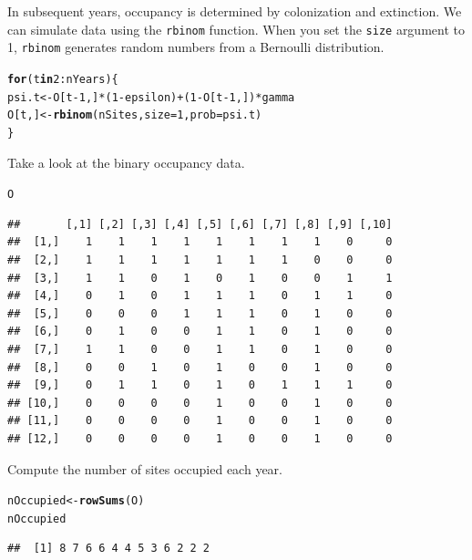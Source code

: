 \documentclass[12pt]{article}\usepackage[]{graphicx}\usepackage[]{color}
\makeatletter
\newcommand{\hlnum}[1]{\textcolor[rgb]{0.686,0.059,0.569}{#1}}%
\newcommand{\hlopt}[1]{\textcolor[rgb]{0,0,0}{#1}}%
\newcommand{\hlstd}[1]{\textcolor[rgb]{0.345,0.345,0.345}{#1}}%
\newcommand{\hlkwa}[1]{\textcolor[rgb]{0.161,0.373,0.58}{\textbf{#1}}}%
\newcommand{\hlkwb}[1]{\textcolor[rgb]{0.69,0.353,0.396}{#1}}%
\newcommand{\hlkwc}[1]{\textcolor[rgb]{0.333,0.667,0.333}{#1}}%
\newcommand{\hlkwd}[1]{\textcolor[rgb]{0.737,0.353,0.396}{\textbf{#1}}}%
\newenvironment{kframe}{%
 \def\at@end@of@kframe{}%
 \ifinner\ifhmode%
  \def\at@end@of@kframe{\end{minipage}}%
  \begin{minipage}{\columnwidth}%
 \fi\fi%
 \def\FrameCommand##1{\hskip\@totalleftmargin \hskip-\fboxsep
 \colorbox{shadecolor}{##1}\hskip-\fboxsep
     \hskip-\linewidth \hskip-\@totalleftmargin \hskip\columnwidth}%
 \MakeFramed {\advance\hsize-\width
   \@totalleftmargin\z@ \linewidth\hsize
   \@setminipage}}%
 {\par\unskip\endMakeFramed%
 \at@end@of@kframe}
\newenvironment{knitrout}{}{} %
\makeatother
\begin{document}
In subsequent years, occupancy is determined by colonization and
extinction. We can simulate data using the {\tt rbinom}
function. When you set the {\tt size} argument to 1, {\tt rbinom}
generates random numbers from a Bernoulli distribution.
\begin{knitrout}
\color{fgcolor}\begin{kframe}
\begin{alltt}
\hlkwa{for}\hlstd{(t} \hlkwa{in} \hlnum{2}\hlopt{:}\hlstd{nYears) \{}
    \hlstd{psi.t} \hlkwb{<-} \hlstd{O[t}\hlopt{-}\hlnum{1}\hlstd{,]}\hlopt{*}\hlstd{(}\hlnum{1}\hlopt{-}\hlstd{epsilon)} \hlopt{+} \hlstd{(}\hlnum{1}\hlopt{-}\hlstd{O[t}\hlopt{-}\hlnum{1}\hlstd{,])}\hlopt{*}\hlstd{gamma}
    \hlstd{O[t,]} \hlkwb{<-} \hlkwd{rbinom}\hlstd{(nSites,} \hlkwc{size}\hlstd{=}\hlnum{1}\hlstd{,} \hlkwc{prob}\hlstd{=psi.t)}
\hlstd{\}}
\end{alltt}
\end{kframe}
\end{knitrout}

Take a look at the binary occupancy data.
\begin{knitrout}
\color{fgcolor}\begin{kframe}
\begin{alltt}
\hlstd{O}
\end{alltt}
\begin{verbatim}
##       [,1] [,2] [,3] [,4] [,5] [,6] [,7] [,8] [,9] [,10]
##  [1,]    1    1    1    1    1    1    1    1    0     0
##  [2,]    1    1    1    1    1    1    1    0    0     0
##  [3,]    1    1    0    1    0    1    0    0    1     1
##  [4,]    0    1    0    1    1    1    0    1    1     0
##  [5,]    0    0    0    1    1    1    0    1    0     0
##  [6,]    0    1    0    0    1    1    0    1    0     0
##  [7,]    1    1    0    0    1    1    0    1    0     0
##  [8,]    0    0    1    0    1    0    0    1    0     0
##  [9,]    0    1    1    0    1    0    1    1    1     0
## [10,]    0    0    0    0    1    0    0    1    0     0
## [11,]    0    0    0    0    1    0    0    1    0     0
## [12,]    0    0    0    0    1    0    0    1    0     0
\end{verbatim}
\end{kframe}
\end{knitrout}

Compute the number of sites occupied each year.
\begin{knitrout}
\color{fgcolor}\begin{kframe}
\begin{alltt}
\hlstd{nOccupied} \hlkwb{<-} \hlkwd{rowSums}\hlstd{(O)}
\hlstd{nOccupied}
\end{alltt}
\begin{verbatim}
##  [1] 8 7 6 6 4 4 5 3 6 2 2 2
\end{verbatim}
\end{kframe}
\end{knitrout}
\end{document}
